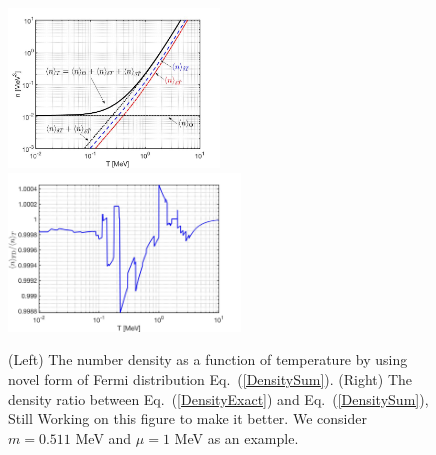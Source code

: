\documentclass[sn-mathphys,Numbered]{sn-jnl}
\begin{document}
\begin{figure}[ht]
\centering
\includegraphics[width=0.5\textwidth]{./plot/Fermi_DenistyTest}\includegraphics[width=0.55\textwidth]{./plot/FermiRatio5000}
\caption{(Left) The number density as a function of temperature by using  novel form of Fermi distribution Eq.~(\ref{DensitySum}). {\color{red}(Right) The density ratio between  Eq.~(\ref{DensityExact}) and Eq.~(\ref{DensitySum}), Still Working on this figure to make it better}. We consider $m=0.511$ MeV and $\mu=1$ MeV as an example.  }
\label{Density_checking}
\end{figure}





\end{document}
